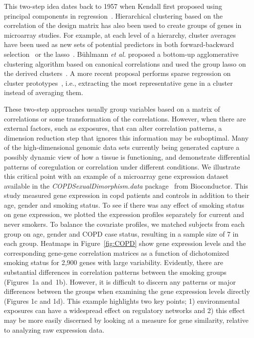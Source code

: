 This two-step idea dates back to 1957 when Kendall first proposed using principal components in regression~\citep{kendall1975multivariate}. Hierarchical clustering based on the correlation of the design matrix has also been used to create groups of genes in microarray studies. For example, at each level of a hierarchy, cluster averages have been used as new sets of potential predictors in both forward-backward selection~\citep{hastie2001supervised} or the lasso~\citep{park2007averaged}. B{\"u}hlmann \textit{et al.} proposed a bottom-up agglomerative clustering algorithm based on canonical correlations and used the group lasso on the derived clusters~\citep{buhlmann2013correlated}. A more recent proposal performs sparse regression on cluster prototypes~\citep{reid2016sparse}, i.e., extracting the most representative gene in a cluster instead of averaging them. 

These two-step approaches usually group variables based on a matrix of correlations or some transformation of the correlations. However, when there are external factors, such as exposures, that can alter correlation patterns, a dimension reduction step that ignores this information may be suboptimal. Many of the high-dimensional genomic data sets currently being generated  capture a possibly dynamic view of how a tissue is functioning, and demonstrate differential patterns of coregulation or correlation under different conditions. We illustrate this critical point with an example of a microarray gene expression dataset available in the \emph{COPDSexualDimorphism.data} package~\citep{copd} from Bioconductor. This study measured gene expression in \ac{copd} patients and controls in addition to their age, gender and smoking status. To see if there was any effect of smoking status on gene expression, we plotted the expression profiles separately for current and never smokers. To balance the covariate profiles, we matched subjects from each group on age, gender and COPD case status, resulting in a sample size of 7 in each group. Heatmaps in Figure~\ref{fig:COPD} show gene expression levels and the corresponding gene-gene correlation matrices as a function of dichotomized smoking status for 2,900 genes with large variability. Evidently, there are substantial differences in correlation patterns between the smoking groups (Figures~1a and~1b). However, it is difficult to discern any patterns or major differences between the groups when examining the gene expression levels directly (Figures 1c and 1d). This example highlights two key points; 1) environmental exposures can have a widespread effect on regulatory networks and 2) this effect may be more easily discerned by looking at a measure for gene similarity, relative to analyzing raw expression data.  


